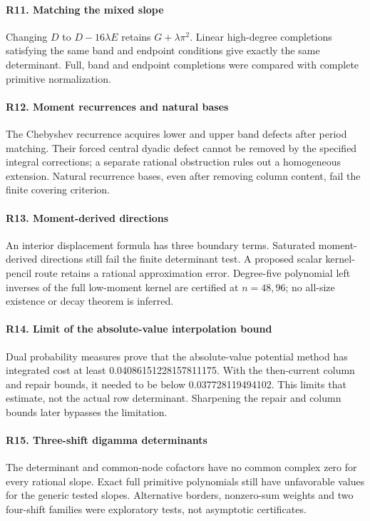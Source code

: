 \paragraph{R11. Matching the mixed slope}\label{record-R11}
Changing $D$ to $D-16\lambda E$ retains $G+\lambda\pi^2$. Linear high-degree completions satisfying the same band and endpoint conditions give exactly the same determinant. Full, band and endpoint completions were compared with complete primitive normalization.

\paragraph{R12. Moment recurrences and natural bases}\label{record-R12}
The Chebyshev recurrence acquires lower and upper band defects after period matching. Their forced central dyadic defect cannot be removed by the specified integral corrections; a separate rational obstruction rules out a homogeneous extension. Natural recurrence bases, even after removing column content, fail the finite covering criterion.

\paragraph{R13. Moment-derived directions}\label{record-R13}
An interior displacement formula has three boundary terms. Saturated moment-derived directions still fail the finite determinant test. A proposed scalar kernel-pencil route retains a rational approximation error. Degree-five polynomial left inverses of the full low-moment kernel are certified at $n=48,96$; no all-size existence or decay theorem is inferred.

\paragraph{R14. Limit of the absolute-value interpolation bound}\label{record-R14}
Dual probability measures prove that the absolute-value potential method has integrated cost at least 0.04086151228157811175. With the then-current column and repair bounds, it needed to be below 0.037728119494102. This limits that estimate, not the actual row determinant. Sharpening the repair and column bounds later bypasses the limitation.

\paragraph{R15. Three-shift digamma determinants}\label{record-R15}
The determinant and common-node cofactors have no common complex zero for every rational slope. Exact full primitive polynomials still have unfavorable values for the generic tested slopes. Alternative borders, nonzero-sum weights and two four-shift families were exploratory tests, not asymptotic certificates.


